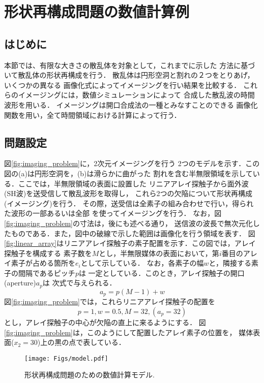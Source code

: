 \section{形状再構成問題の数値計算例}
\subsection{はじめに}
本節では、有限な大きさの散乱体を対象として，これまでに示した
方法に基づいて散乱体の形状再構成を行う．
散乱体は円形空洞と割れの２つをとりあげ，いくつかの異なる
画像化式によってイメージングを行い結果を比較する．
これらのイメージングには，数値シミュレーションによって
合成した散乱波の時間波形を用いる．
イメージングは開口合成法の一種とみなすことのできる
画像化関数を用い，全て時間領域における計算によって行う．
\subsection{問題設定}
図\ref{fig:imaging_problem}に，2次元イメージングを行う
2つのモデルを示す．この図の(a)は円形空洞を，(b)は滑らかに曲がった
割れを含む半無限領域を示している．ここでは，半無限領域の表面に設置した
リニアアレイ探触子から面外波(SH波)を送受信して散乱波形を取得し，
これら2つの欠陥について形状再構成(イメージング)を行う．
その際，送受信は全素子の組み合わせで行い，得られた波形の一部あるいは全部
を使ってイメージングを行う．
なお，図\ref{fig:imaging_problem}の寸法は，後にも述べる通り，
送信波の波長で無次元化したものである．また，図中の破線で示した範囲は画像化を行う領域を表す．
図\ref{fig:linear_array}はリニアアレイ探触子の素子配置を示す．この図では，アレイ探触子を構成する
素子数を$M$とし，半無限媒体の表面において，第$i$番目のアレイ素子が占める箇所を$e_i$として示している．
なお，各素子の幅$w$と，隣接する素子の間隔であるピッチ$p$は
一定としている．このとき，アレイ探触子の開口(aperture)$a_p$は
次式で与えられる．
\begin{equation}
	a_p=p(M-1)+w
	\label{eqn:aperture}
\end{equation}
図\ref{fig:imaging_problem}では，これらリニアアレイ探触子の配置を
\[
	p=1, w=0.5, M=32, (a_p=32)
\]
とし，アレイ探触子の中心が欠陥の直上に来るようにする．
図\ref{fig:imaging_problem}は，このようにして配置したアレイ素子の位置を，
媒体表面($x_2=30$)上の黒の点で表している．
\begin{figure}[h]
	\begin{center}
	\texttt{[image: Figs/model.pdf]} 
	\end{center}
	\caption{ 形状再構成問題のための数値計算モデル.}
	\label{fig:imging_problem}
\end{figure}
